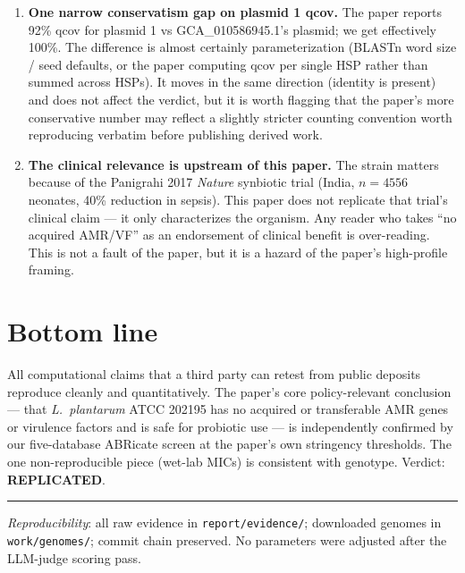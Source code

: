 \documentclass[11pt,letterpaper]{article}
\begin{document}
\begin{enumerate}
\item \textbf{One narrow conservatism gap on plasmid 1 qcov.} The paper reports 92\% qcov for
      plasmid 1 vs GCA\_010586945.1's plasmid; we get effectively 100\%. The difference is
      almost certainly parameterization (BLASTn word size / seed defaults, or the paper
      computing qcov per single HSP rather than summed across HSPs). It moves in the same
      direction (identity is present) and does not affect the verdict, but it is worth flagging
      that the paper's more conservative number may reflect a slightly stricter counting
      convention worth reproducing verbatim before publishing derived work.

\item \textbf{The clinical relevance is upstream of this paper.} The strain matters because
      of the Panigrahi 2017 \textit{Nature} synbiotic trial (India, $n{=}4556$ neonates,
      40\% reduction in sepsis). This paper does not replicate that trial's clinical claim
      --- it only characterizes the organism. Any reader who takes ``no acquired AMR/VF''
      as an endorsement of clinical benefit is over-reading. This is not a fault of the
      paper, but it is a hazard of the paper's high-profile framing.
\end{enumerate}

\section{Bottom line}

All computational claims that a third party can retest from public deposits reproduce cleanly
and quantitatively. The paper's core policy-relevant conclusion --- that \textit{L.\ plantarum}
ATCC 202195 has no acquired or transferable AMR genes or virulence factors and is safe for
probiotic use --- is independently confirmed by our five-database ABRicate screen at the paper's
own stringency thresholds. The one non-reproducible piece (wet-lab MICs) is consistent with
genotype. Verdict: \textbf{REPLICATED}.

\vspace{1em}
\hrule
\vspace{0.5em}
\noindent\small\textit{Reproducibility}: all raw evidence in \texttt{report/evidence/}; downloaded genomes in
\texttt{work/genomes/}; commit chain preserved. No parameters were adjusted after the LLM-judge
scoring pass.
\end{document}
